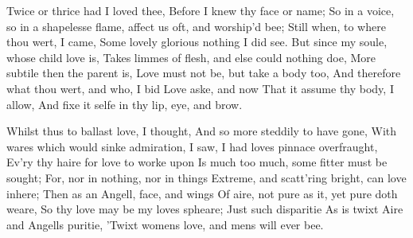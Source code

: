 \documentclass{book}
\newenvironment{poem}[1]%
  {\poemtitle{#1}%
   \Versus
   \numerus{1}%
  }
  {\endVersus}
\begin{document}
    
\begin{poem}{Aire and Angels} %
\Forma {}
      
 Twice or thrice had I loved thee,        
  Before I knew thy face or name;        
  So in a voice, so in a shapelesse flame,     \auto      
   affect us oft, and worship'd bee;        
    Still when, to where thou wert, I came,       
  Some lovely glorious nothing I did see.        
    But since my soule, whose child love is,        
  Takes limmes of flesh, and else could nothing doe,        
    More subtile then the parent is,        
  Love must not be, but take a body too,       
    And therefore what thou wert, and who,        
        I bid Love aske, and now        
  That it assume thy body, I allow,        
  And fixe it selfe in thy lip, eye, and brow.        
       
  Whilst thus to ballast love, I thought,       
  And so more steddily to have gone,        
  With wares which would sinke admiration,        
  I saw, I had loves pinnace overfraught,        
    Ev'ry thy haire for love to worke upon        
  Is much too much, some fitter must be sought;       
    For, nor in nothing, nor in things        
  Extreme, and scatt'ring bright, can love inhere;        
    Then as an Angell, face, and wings        
  Of aire, not pure as it, yet pure doth weare,        
    So thy love may be my loves spheare;       
        Just such disparitie        
  As is twixt Aire and Angells puritie,        
  'Twixt womens love, and mens will ever bee.        
\end{poem}
    
\end{document}
